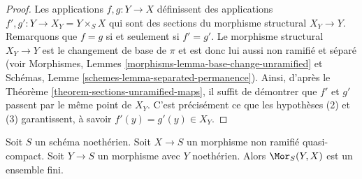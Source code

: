 \begin{proof}
Les applications $f, g : Y \to X$ définissent des applications $f', g' : Y \to X_Y = Y \times_S X$
qui sont des sections du morphisme structural $X_Y \to Y$.
Remarquons que $f = g$ si et seulement si $f' = g'$.
Le morphisme structural $X_Y \to Y$ est le changement de base de $\pi$ et est donc
lui aussi non ramifié et séparé (voir
Morphismes, Lemmes \ref{morphisms-lemma-base-change-unramified} et
Schémas, Lemme \ref{schemes-lemma-separated-permanence}).
Ainsi, d'après le Théorème \ref{theorem-sections-unramified-maps},
il suffit de démontrer que $f'$ et $g'$ passent par le même
point de $X_Y$. C'est précisément ce que les hypothèses (2) et (3)
garantissent, à savoir $f'(y) = g'(y) \in X_Y$.
\end{proof}

\begin{lemma}
\label{lemma-finitely-many-maps-to-unramified}
Soit $S$ un schéma noethérien. Soit $X \to S$ un morphisme non ramifié quasi-compact.
Soit $Y \to S$ un morphisme avec $Y$ noethérien. Alors
$\Mor_S(Y, X)$ est un ensemble fini.
\end{lemma}

